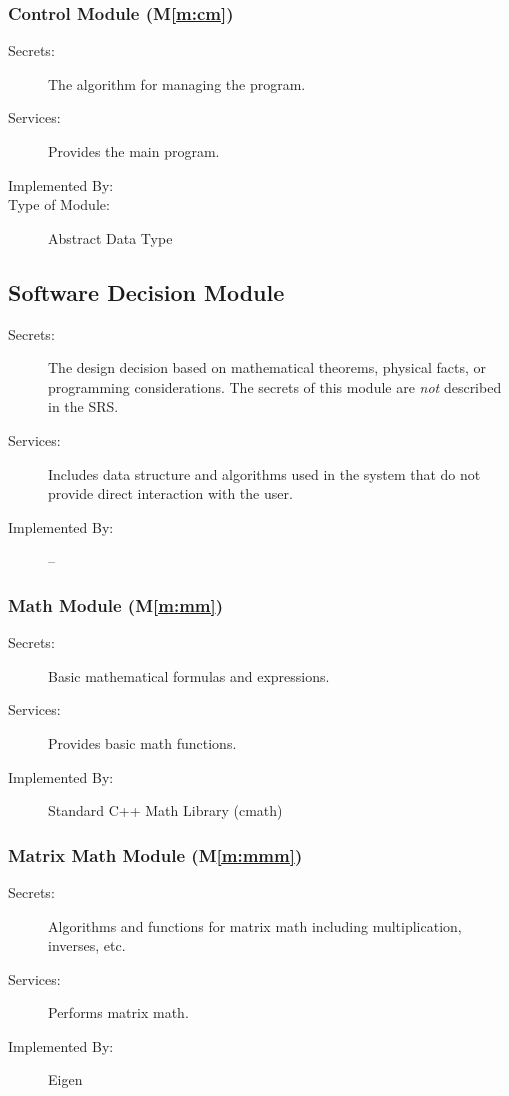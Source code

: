 \documentclass[12pt, titlepage]{article}
\newcommand{\mref}[1]{M\ref{#1}}
\begin{document}
\subsubsection{Control Module (\mref{m:cm})}

\begin{description}
\item[Secrets:] The algorithm for managing the program.
\item[Services:] Provides the main program.
\item[Implemented By:] \progname
\item[Type of Module:] Abstract Data Type
\end{description}

\subsection{Software Decision Module}

\begin{description}
\item[Secrets:] The design decision based on mathematical theorems, physical facts, or programming
  considerations. The secrets of this module are \emph{not} described in the SRS.
\item[Services:] Includes data structure and algorithms used in the system that do not provide
  direct interaction with the user.
\item[Implemented By:] --
\end{description}

\subsubsection{Math Module (\mref{m:mm})}
\begin{description}
  \item[Secrets:] Basic mathematical formulas and expressions.
  \item[Services:] Provides basic math functions.
  \item[Implemented By:] Standard C++ Math Library (cmath)
\end{description}

\subsubsection{Matrix Math Module (\mref{m:mmm})}
\begin{description}
  \item[Secrets:] Algorithms and functions for matrix math including multiplication, inverses, etc.
  \item[Services:] Performs matrix math.
  \item[Implemented By:] Eigen \citep{eigenweb}
\end{description}
\end{document}
